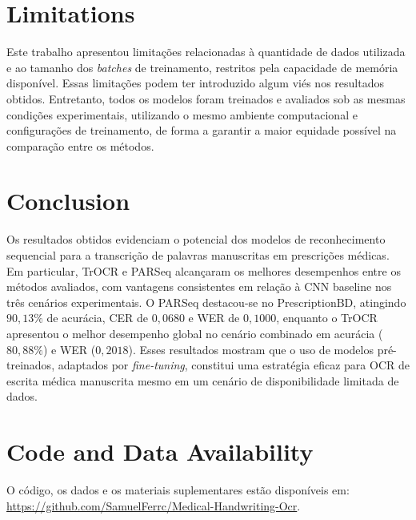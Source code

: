 \documentclass[11pt,a4paper]{article}
\begin{document}
\section{Limitations}
\label{sec:limitations}

Este trabalho apresentou limitações relacionadas à quantidade de dados utilizada e ao tamanho dos \textit{batches} de treinamento, restritos pela capacidade de memória disponível. Essas limitações podem ter introduzido algum viés nos resultados obtidos. Entretanto, todos os modelos foram treinados e avaliados sob as mesmas condições experimentais, utilizando o mesmo ambiente computacional e configurações de treinamento, de forma a garantir a maior equidade possível na comparação entre os métodos.


\section{Conclusion}
\label{sec:conclusion}

Os resultados obtidos evidenciam o potencial dos modelos de reconhecimento sequencial para a transcrição de palavras manuscritas em prescrições médicas. Em particular, TrOCR e PARSeq alcançaram os melhores desempenhos entre os métodos avaliados, com vantagens consistentes em relação à CNN baseline nos três cenários experimentais. O PARSeq destacou-se no PrescriptionBD, atingindo $90{,}13\%$ de acurácia, CER de $0{,}0680$ e WER de $0{,}1000$, enquanto o TrOCR apresentou o melhor desempenho global no cenário combinado em acurácia ($80{,}88\%$) e WER ($0{,}2018$). Esses resultados mostram que o uso de modelos pré-treinados, adaptados por \textit{fine-tuning}, constitui uma estratégia eficaz para OCR de escrita médica manuscrita mesmo em um cenário de disponibilidade limitada de dados.

\section*{Code and Data Availability}

O código, os dados e os materiais suplementares estão disponíveis em:
\url{https://github.com/SamuelFerrc/Medical-Handwriting-Ocr}. 



\end{document}
